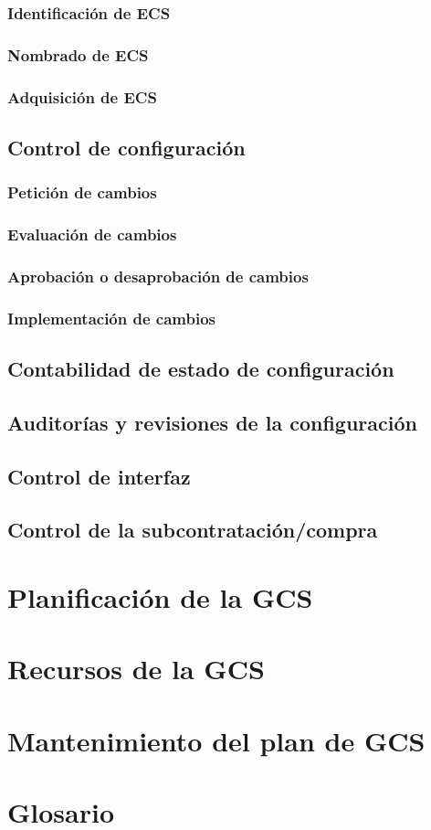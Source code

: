 \documentclass[11pt, a4paper, twoside, titlepage]{article}
\begin{document}
			\subsubsection{Identificación de ECS}
			\subsubsection{Nombrado de ECS}
			\subsubsection{Adquisición de ECS}
		\subsection{Control de configuración}
			\subsubsection{Petición de cambios}
			\subsubsection{Evaluación de cambios}
			\subsubsection{Aprobación o desaprobación de cambios}
			\subsubsection{Implementación de cambios}
		\subsection{Contabilidad de estado de configuración}
		\subsection{Auditorías y revisiones de la configuración}
		\subsection{Control de interfaz}
		\subsection{Control de la subcontratación/compra}
	\section{Planificación de la GCS}
	\section{Recursos de la GCS}
	\section{Mantenimiento del plan de GCS}
	\section{Glosario}
		\printglossaries

\end{document}
